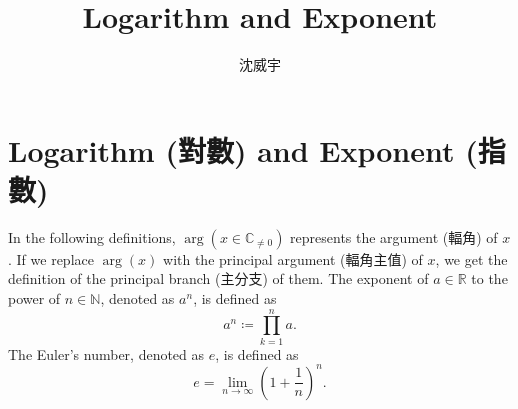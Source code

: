 \documentclass[a4paper,12pt]{article}
\begin{document}
\title{Logarithm and Exponent}
\author{沈威宇}
\date{\temtoday}
\titletocdoc
\section{Logarithm (對數) and Exponent (指數)}
In the following definitions, $\arg(x\in\mathbb{C}_{\neq 0})$ represents the argument (輻角) of $x$. If we replace $\arg(x)$ with the principal argument (輻角主值) of $x$, we get the definition of the principal branch (主分支) of them.
The exponent of $a\in\mathbb{R}$ to the power of $n\in\mathbb{N}$, denoted as $a^n$, is defined as
\[a^n\coloneq\prod_{k=1}^na.\]
The Euler's number, denoted as $e$, is defined as
\[e=\lim_{n\to\infty}\left(1+\frac{1}{n}\right)^n.\]
\end{document}
